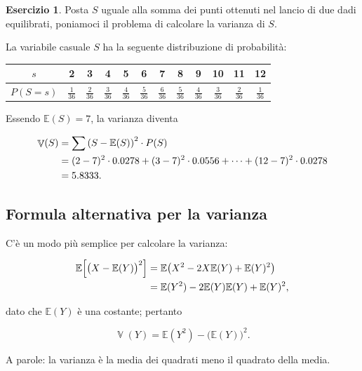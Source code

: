 \documentclass[
  11pt,
]{krantz}
\DeclareMathOperator{\Var}{\mathbb{V}} %
\newcommand{\E}{\mathbb{E}} %
\theoremstyle{definition}
\theoremstyle{definition}
\theoremstyle{definition}
\newtheorem{exercise}{Esercizio}[chapter]
\theoremstyle{definition}
\theoremstyle{remark}
\begin{document}
\begin{exercise}
Posta \(S\) uguale alla somma dei punti ottenuti nel lancio di due dadi equilibrati, poniamoci il problema di calcolare la varianza di \(S\).

La variabile casuale \(S\) ha la seguente distribuzione di probabilità:

\begin{longtable}[]{@{}cccccccccccc@{}}
\toprule
\(s\) & 2 & 3 & 4 & 5 & 6 & 7 & 8 & 9 & 10 & 11 & 12 \\
\midrule
\endhead
\(P(S = s)\) & \(\frac{1}{36}\) & \(\frac{2}{36}\) & \(\frac{3}{36}\) & \(\frac{4}{36}\) & \(\frac{5}{36}\) & \(\frac{6}{36}\) & \(\frac{5}{36}\) & \(\frac{4}{36}\) & \(\frac{3}{36}\) & \(\frac{2}{36}\) & \(\frac{1}{36}\) \\
\bottomrule
\end{longtable}

\noindent Essendo \(\E(S) = 7\), la varianza diventa

\begin{align}
\Var(S) &= \sum \left(S- \mathbb{E}(S)\right)^2 \cdot P(S) \notag\\
&= (2 - 7)^2 \cdot 0.0278 + (3-7)^2 \cdot 0.0556 + \dots + (12 - 7)^2 \cdot 0.0278 \notag\\
&= 5.8333.\notag
\end{align}
\end{exercise}

\hypertarget{formula-alternativa-per-la-varianza}{%
\subsection{Formula alternativa per la varianza}\label{formula-alternativa-per-la-varianza}}

C'è un modo più semplice per calcolare la varianza:

\begin{align}
\E\Big[\big(X - \E(Y)\big)^2\Big] &= \E\big(X^2 - 2X\E(Y) + \E(Y)^2\big)\notag\\
&= \E(Y^2) - 2\E(Y)\E(Y) + \E(Y)^2,\notag
\end{align}

dato che \(\E(Y)\) è una costante; pertanto

\begin{equation}
\Var(Y) = \E(Y^2) - \big(\E(Y) \big)^2.
\label{eq:def-alt-var-rv}
\end{equation}

A parole: la varianza è la media dei quadrati meno il quadrato della media.
\end{document}

